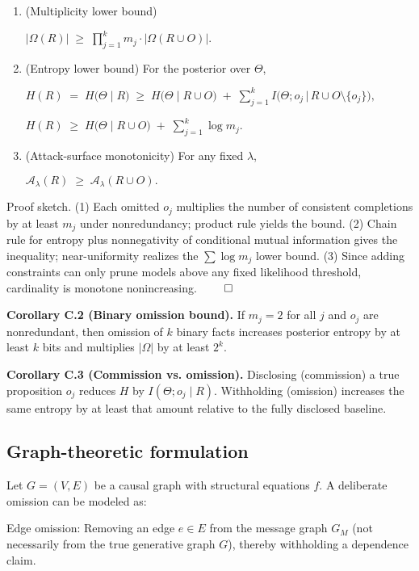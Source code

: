 \documentclass[12pt,a4paper]{article}
\begin{document}
\begin{enumerate}
\item (Multiplicity lower bound)

$|\Omega(R)| \;\ge\; \prod_{j=1}^k m_j \cdot |\Omega(R\cup O)|.$

\item (Entropy lower bound) For the posterior over $\Theta$,

$H(R)\;=\;H\big(\Theta\mid R\big) \;\ge\; H\big(\Theta\mid R\cup O\big)\;+\;\sum_{j=1}^k I\big(\Theta; o_j \,\big|\, R\cup O\setminus\{o_j\}\big),$

$H(R)\;\ge\;H\big(\Theta\mid R\cup O\big)\;+\;\sum_{j=1}^k \log m_j .$

\item (Attack-surface monotonicity) For any fixed $\lambda$,

$\mathcal{A}_\lambda(R)\;\ge\;\mathcal{A}_\lambda(R\cup O).$
\end{enumerate}

Proof sketch. (1) Each omitted $o_j$ multiplies the number of consistent completions by at least $m_j$ under nonredundancy; product rule yields the bound. (2) Chain rule for entropy plus nonnegativity of conditional mutual information gives the inequality; near-uniformity realizes the $\sum \log m_j$ lower bound. (3) Since adding constraints can only prune models above any fixed likelihood threshold, cardinality is monotone nonincreasing. $\qed$

\textbf{Corollary C.2 (Binary omission bound).} If $m_j=2$ for all $j$ and $o_j$ are nonredundant, then omission of $k$ binary facts increases posterior entropy by at least $k$ bits and multiplies $|\Omega|$ by at least $2^k$.

\textbf{Corollary C.3 (Commission vs. omission).} Disclosing (commission) a true proposition $o_j$ reduces $H$ by $I(\Theta; o_j \mid R)$. Withholding (omission) increases the same entropy by at least that amount relative to the fully disclosed baseline.

\subsection{Graph-theoretic formulation}

Let $G = (V,E)$ be a causal graph with structural equations $f$. A deliberate omission can be modeled as:

Edge omission: Removing an edge $e \in E$ from the message graph $G_M$ (not necessarily from the true generative graph $G$), thereby withholding a dependence claim.
\end{document}
